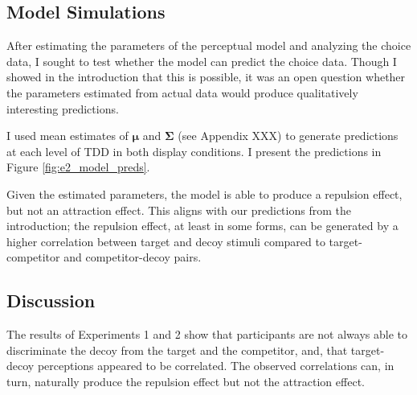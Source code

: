 \subsection{Model Simulations}
After estimating the parameters of the perceptual model and analyzing the choice data, I sought to test whether the model can predict the choice data. Though I showed in the introduction that this is possible, it was an open question whether the parameters estimated from actual data would produce qualitatively interesting predictions.

I used mean estimates of $\boldsymbol{\mu}$ and $\boldsymbol{\Sigma}$ (see Appendix XXX) to generate predictions at each level of TDD in both display conditions. I present the predictions in Figure \ref{fig:e2_model_preds}. 

Given the estimated parameters, the model is able to produce a repulsion effect, but not an attraction effect. This aligns with our predictions from the introduction; the repulsion effect, at least in some forms, can be generated by a higher correlation between target and decoy stimuli compared to target-competitor and competitor-decoy pairs.

\subsection{Discussion}

The results of Experiments 1 and 2 show that participants are not always able to discriminate the decoy from the target and the competitor, and, that target-decoy perceptions appeared to be correlated. The observed correlations can, in turn, naturally produce the repulsion effect but not the attraction effect. 
